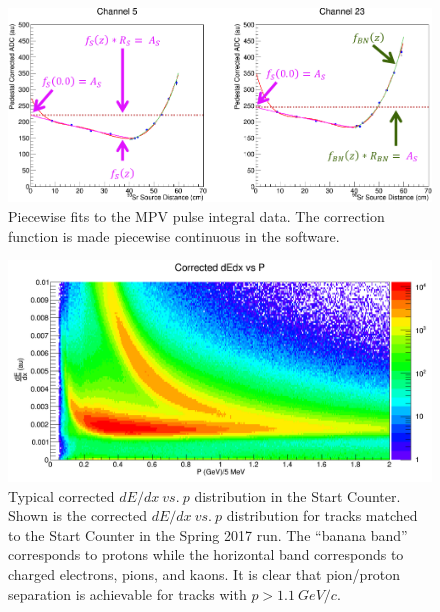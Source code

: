 \begin{figure}
	\centering
	\includegraphics[width=1.0\columnwidth]{calibration/figs/attn_fits}
	\caption{Piecewise fits to the MPV pulse integral data. The correction function is made piecewise continuous in the software.}
	\label{fig:attnfits}
\end{figure}

\begin{figure}[!htb]
	\centering
	\includegraphics[width=1.0\columnwidth]{calibration/figs/dEdx_vs_p_corr}
	\caption{Typical corrected $dE/dx\ vs.\ p$ distribution in the Start Counter.  Shown is the corrected $dE/dx\ vs.\ p$ distribution for tracks matched to the Start Counter in the Spring 2017 run. The ``banana band'' corresponds to protons while the horizontal band corresponds to charged electrons, pions, and kaons.  It is clear that pion/proton separation is achievable for tracks with $p > 1.1\ GeV/c$.}
	\label{fig:dEdx_vs_p_corr}
\end{figure}

